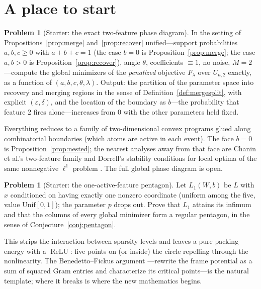 \documentclass[11pt]{amsart}
\theoremstyle{plain}
\theoremstyle{definition}
\newtheorem{problem}[theorem]{Problem}
\DeclareMathOperator{\relu}{ReLU}
\begin{document}
\section{A place to start}\label{sec:start}

\begin{problem}[Starter: the exact two-feature phase diagram]\label{prob:starter-phase}
In the setting of Propositions~\ref{prop:merge} and~\ref{prop:recover} unified---support probabilities $a,b,c\ge0$ with $a+b+c=1$ (the case $b=0$ is Proposition~\ref{prop:merge}; the case $a,b>0$ is Proposition~\ref{prop:recover}), angle $\theta$, coefficients $\equiv1$, no noise, $M=2$---compute the global minimizers of the \emph{penalized} objective $F_\lambda$ over $U_{n,2}$ exactly, as a function of $(a,b,c,\theta,\lambda)$. Output: the partition of the parameter space into recovery and merging regions in the sense of Definition~\ref{def:mergesplit}, with explicit $(\varepsilon,\delta)$, and the location of the boundary as $b$---the probability that feature $2$ fires alone---increases from $0$ with the other parameters held fixed.
\end{problem}

Everything reduces to a family of two-dimensional convex programs glued along combinatorial boundaries (which atoms are active in each event). The face $b=0$ is Proposition~\ref{prop:nested}; the nearest analyses away from that face are Chanin et al.'s two-feature family \cite{chanin2024} and Dorrell's stability conditions for local optima of the same nonnegative $\ell^1$ problem \cite{dorrell2026}. The full global phase diagram is open.

\begin{problem}[Starter: the one-active-feature pentagon]\label{prob:starter-pentagon}
Let $L_1(W,b)$ be $L$ with $x$ conditioned on having exactly one nonzero coordinate (uniform among the five, value $\mathrm{Unif}[0,1]$); the parameter $p$ drops out. Prove that $L_1$ attains its infimum and that the columns of every global minimizer form a regular pentagon, in the sense of Conjecture~\ref{conj:pentagon}.
\end{problem}

This strips the interaction between sparsity levels and leaves a pure packing energy with a $\relu$: five points on (or inside) the circle repelling through the nonlinearity. The Benedetto--Fickus argument \cite{benedetto2003}---rewrite the frame potential as a sum of squared Gram entries and characterize its critical points---is the natural template; where it breaks is where the new mathematics begins.
\end{document}
